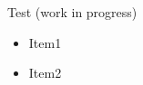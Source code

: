\documentclass{beamer}
\begin{document}
\begin{frame}{Test (work in progress)\footnotemark}
\begin{itemize}
\item Item1
\item Item2
\end{itemize}
\end{frame}
\end{document}
